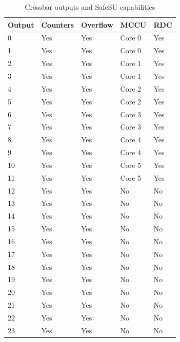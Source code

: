 \begin{table}
	\caption{Crossbar outputs and SafeSU capabilities}
	\label{tab:features}
\begin{small}
	\begin{center} 
		\begin{tabular}{|l|l|l|l|l|}
			\hline
			\textbf{Output} & \textbf{Counters} & \textbf{Overflow}  & \textbf{MCCU}  & \textbf{RDC}\\
			\hline
			0 & Yes & Yes & Core 0 & Yes \\
			\hline
			1 & Yes & Yes & Core 0 & Yes \\
			\hline
			2 & Yes & Yes & Core 1 & Yes \\
			\hline
			3 & Yes & Yes & Core 1 & Yes \\
			\hline
			4 & Yes & Yes & Core 2 & Yes \\
			\hline
			5 & Yes & Yes & Core 2 & Yes \\
			\hline
			6 & Yes & Yes & Core 3 & Yes \\
			\hline
			7 & Yes & Yes & Core 3 & Yes \\
			\hline
			8 & Yes & Yes & Core 4 & Yes \\
			\hline
			9 & Yes & Yes & Core 4 & Yes \\
			\hline
			10 & Yes & Yes & Core 5 & Yes \\
			\hline
			11 & Yes & Yes & Core 5 & Yes\\
			\hline
			12 & Yes & Yes & No & No \\
			\hline
			13 & Yes & Yes & No & No \\
			\hline
			14 & Yes & Yes & No & No \\
			\hline
			15 & Yes & Yes & No & No \\
			\hline
			16 & Yes & Yes & No & No \\
			\hline
			17 & Yes & Yes & No & No \\
			\hline
			18 & Yes & Yes & No & No \\
			\hline
			19 & Yes & Yes & No & No \\
			\hline
			20 & Yes & Yes & No & No \\
			\hline
			21 & Yes & Yes & No & No \\
			\hline
			22 & Yes & Yes & No & No \\
			\hline
			23 & Yes & Yes & No & No \\
			\hline
		\end{tabular}
	\end{center}
\end{small}
\end{table}

